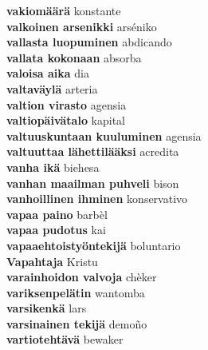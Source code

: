 \textbf{ vakiomäärä  } konstante \\
\textbf{ valkoinen arsenikki  } arséniko \\
\textbf{ vallasta luopuminen  } abdicando \\
\textbf{ vallata kokonaan  } absorba \\
\textbf{ valoisa aika  } dia \\
\textbf{ valtaväylä  } arteria \\
\textbf{ valtion  virasto  } agensia \\
\textbf{ valtiopäivätalo  } kapital \\
\textbf{ valtuuskuntaan kuuluminen  } agensia \\
\textbf{ valtuuttaa lähettilääksi  } acredita \\
\textbf{ vanha ikä  } biehesa \\
\textbf{ vanhan  maailman  puhveli  } bison \\
\textbf{ vanhoillinen ihminen  } konservativo \\
\textbf{ vapaa paino  } barbèl \\
\textbf{ vapaa pudotus  } kai \\
\textbf{ vapaaehtoistyöntekijä  } boluntario \\
\textbf{ Vapahtaja  } Kristu \\
\textbf{ varainhoidon valvoja  } chèker \\
\textbf{ variksenpelätin  } wantomba \\
\textbf{ varsikenkä  } lars \\
\textbf{ varsinainen tekijä  } demoño \\
\textbf{ vartiotehtävä  } bewaker \\
